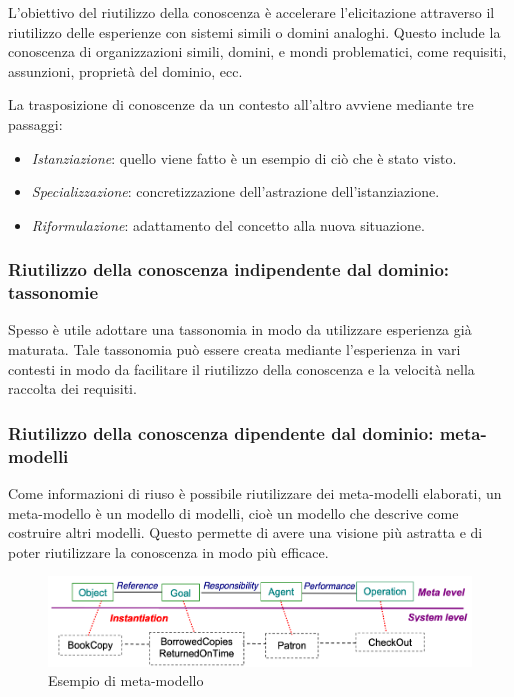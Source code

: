 L'obiettivo del riutilizzo della conoscenza è accelerare
l'elicitazione attraverso il riutilizzo delle esperienze con sistemi simili
o domini analoghi.
Questo include la conoscenza di organizzazioni simili, domini, e mondi problematici,
come requisiti, assunzioni, proprietà del dominio, ecc.

La trasposizione di conoscenze da un contesto all'altro avviene mediante tre passaggi:
\begin{itemize}
    \item \textit{Istanziazione}: quello viene fatto è un esempio di ciò che è 
    stato visto.
    \item \textit{Specializzazione}: concretizzazione dell'astrazione 
    dell'istanziazione.
    \item \textit{Riformulazione}: adattamento del concetto alla nuova situazione.
\end{itemize}
\subsubsection{Riutilizzo della conoscenza indipendente dal dominio: tassonomie}
Spesso è utile adottare una tassonomia in modo da utilizzare esperienza già maturata.
Tale tassonomia può essere creata mediante l'esperienza in vari contesti in modo 
da facilitare il riutilizzo della conoscenza e la velocità nella raccolta dei requisiti.
\subsubsection{Riutilizzo della conoscenza dipendente dal dominio: meta-modelli}
Come informazioni di riuso è possibile riutilizzare dei meta-modelli elaborati, un 
meta-modello è un modello di modelli, cioè un modello che descrive come costruire
altri modelli. Questo permette di avere una visione più astratta e di poter
riutilizzare la conoscenza in modo più efficace.
\begin{figure}[H]
    \centering
    \includegraphics[scale=0.4]{img/metamodel.png}
    \caption{Esempio di meta-modello}
\end{figure}

